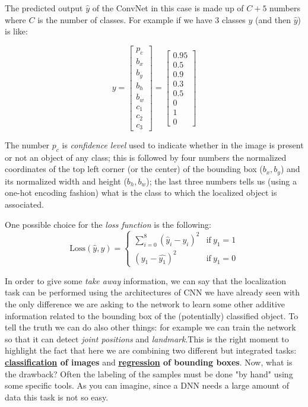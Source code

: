 The predicted output $\hat{y}$ of the ConvNet in this case is made up of $C+5$ numbers where $C$ is the number of classes. 
For example if we have 3 classes $y$ (and then $\hat{y}$) is like: 

\begin{multicols}{2}
    \begin{equation}\label{eq:obj_label}
        y=\begin{bmatrix}
            p_c\\b_x\\b_y\\b_h\\b_w\\c_1\\c_2\\c_3
        \end{bmatrix}=\begin{bmatrix}
            0.95\\0.5\\0.9\\0.3\\0.5\\0\\1\\0
        \end{bmatrix}
    \end{equation}
    \newcolumn

    \noindent
    The number $p_c$ is \textit{confidence level} used to indicate whether in the image is present or not an object of any class; this is followed by four numbers the normalized coordinates of the top left corner (or the center) of the bounding box ($b_x,b_y$) and its normalized width and height ($b_h, b_w$); the last three numbers tells us (using a one-hot encoding fashion) what is the class to which the localized object is associated.
\end{multicols}
One possible choice for the \textit{loss function} is the following: 
\begin{equation}
    \text{Loss}(\hat{y}, y)=
    \begin{cases}
        \sum_{i=0}^{8} {(\hat{y}_i-y_i)^2}&\text{if} \ y_1=1\\
        (y_1-\hat{y_1})^2&\text{if} \ y_1=0
    \end{cases}
\end{equation}

\noindent 
In order to give some \emph{take away} information, we can say that the localization task can be performed using the architectures of CNN we have already seen with the only difference we are asking to the network to learn some other additive information related to the bounding box of the (potentially) classified object. To tell the truth we can do also other things: for example we can train the network so that it can detect \textit{joint positions} and \textit{landmark}.This is the right moment to highlight the fact that here we are combining two different but integrated tasks: \textbf{\underline{classification} of images} and \textbf{\underline{regression} of bounding boxes}.
Now, what is the drawback? Often the labeling of the samples must be done "by hand" using some specific tools. As you can imagine, since a DNN needs a large amount of data this task is not so easy.

